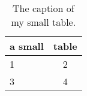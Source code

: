 
\begin{table}[h]
  \begin{center}
    \begin{tabular}{lc}
      a small & table \\
      \hline
      1 & 2 \\
      3 & 4\\
    \end{tabular}
    \caption{The caption of my small table.}
  \end{center}
\end{table}


